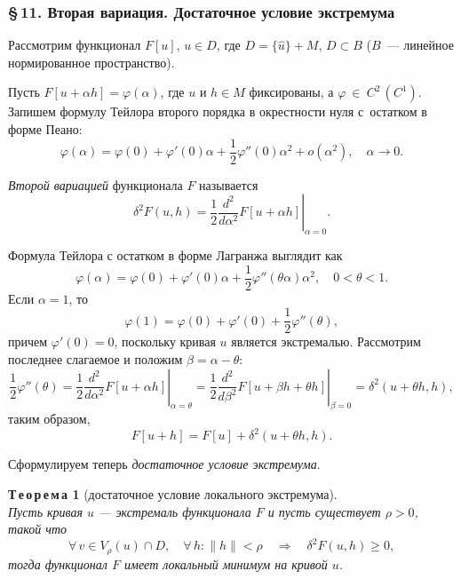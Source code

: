 \documentclass[12pt,a5paper]{book}
\begin{document}
	\subsubsection*{\S\,11. Вторая вариация. Достаточное условие экстремума}
	
	Рассмотрим функционал $F[u]$, $u \in D$, где $D = \{\hat{u}\} + M$, $D \subset B$ ($B$~--- линейное нормированное пространство).
	
	Пусть $F[u + \alpha h] = \varphi(\alpha)$, где $u$ и $h \in M$ фиксированы, а $\varphi~\in~C^2\,(C^1)$. Запишем формулу Тейлора второго порядка в окрестности нуля с~остатком в форме Пеано:
	\begin{equation*}
		\varphi(\alpha) = \varphi(0) + \varphi'(0)\alpha + \frac{1}{2}\varphi''(0)\alpha^2 + o(\alpha^2), \quad \alpha \rightarrow 0.
	\end{equation*}
	
	\emph{Второй вариацией} функционала $F$ называется
	\begin{equation*}
		\delta^2F(u,h) = \left.\frac{1}{2}\frac{d^2}{d\alpha^2}F[u + \alpha h]\right|_{\alpha=0}.
	\end{equation*}
	
	Формула Тейлора с остатком в форме Лагранжа выглядит как
	\begin{equation*}
		\varphi(\alpha) = \varphi(0) + \varphi'(0)\alpha + \frac{1}{2}\varphi''(\theta\alpha)\alpha^2, \quad 0 < \theta < 1.
	\end{equation*}
	Если $\alpha = 1$, то
	\begin{equation*}
		\varphi(1) = \varphi(0) + \varphi'(0) + \frac{1}{2}\varphi''(\theta),
	\end{equation*}
	причем $\varphi'(0) = 0$, поскольку кривая $u$ является экстремалью. Рассмотрим последнее слагаемое и положим $\beta = \alpha - \theta$:
	\begin{equation*}
		\frac{1}{2}\varphi''(\theta) = \left.\frac{1}{2}\frac{d^2}{d\alpha^2}F[u + \alpha h]\right|_{\alpha=\theta} = \left.\frac{1}{2}\frac{d^2}{d\beta^2}F[u + \beta h + \theta h]\right|_{\beta=0} = \delta^2(u + \theta h, h),
	\end{equation*}
	таким образом,
	\begin{equation}\label{2nd_var}
		F[u + h] = F[u] + \delta^2(u + \theta h, h).
	\end{equation}
	
	Сформулируем теперь \textit{достаточное условие экстремума}.
	
	\vspace*{1em}
	\noindent \textbf{Т\,е\,о\,р\,е\,м\,а 1} (достаточное условие локального экстремума).\\ \textit{Пусть кривая $u$ --- экстремаль функционала $F$ и пусть существует $\rho > 0$, такой что}
	\begin{equation}\label{th_locextr_cond}
		\forall\,v \in V_\rho(u) \cap D, \quad \forall\,h: \|h\| < \rho \quad \Rightarrow \quad \delta^2F(u,h) \geq 0,
	\end{equation}
	\textit{тогда функционал $F$ имеет локальный минимум на кривой $u$.}
	
\end{document}
